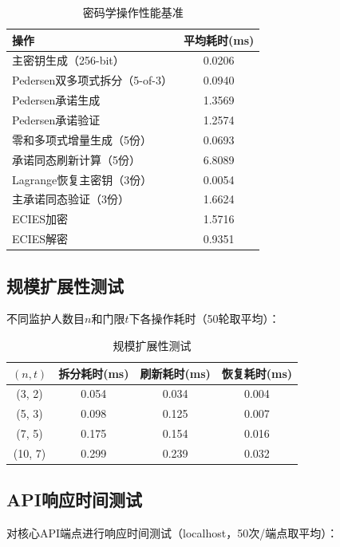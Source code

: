 \documentclass[UTF8,a4paper,zihao=-4,openany]{ctexrep}
\begin{document}
\begin{table}[htbp]
\centering
\caption{密码学操作性能基准}
\label{tab:perf_bench}
\begin{tabularx}{\textwidth}{lc}
\toprule
操作 & 平均耗时(ms)\\
\midrule
主密钥生成（256-bit） & 0.0206\\
Pedersen双多项式拆分（5-of-3） & 0.0940\\
Pedersen承诺生成 & 1.3569\\
Pedersen承诺验证 & 1.2574\\
零和多项式增量生成（5份） & 0.0693\\
承诺同态刷新计算（5份） & 6.8089\\
Lagrange恢复主密钥（3份） & 0.0054\\
主承诺同态验证（3份） & 1.6624\\
ECIES加密 & 1.5716\\
ECIES解密 & 0.9351\\
\bottomrule
\end{tabularx}
\end{table}

\subsection{规模扩展性测试}

不同监护人数目$n$和门限$t$下各操作耗时（50轮取平均）：

\begin{table}[htbp]
\centering
\caption{规模扩展性测试}
\label{tab:scalability}
\begin{tabularx}{\textwidth}{cccc}
\toprule
$(n, t)$ & 拆分耗时(ms) & 刷新耗时(ms) & 恢复耗时(ms)\\
\midrule
(3, 2) & 0.054 & 0.034 & 0.004\\
(5, 3) & 0.098 & 0.125 & 0.007\\
(7, 5) & 0.175 & 0.154 & 0.016\\
(10, 7) & 0.299 & 0.239 & 0.032\\
\bottomrule
\end{tabularx}
\end{table}

\subsection{API响应时间测试}

对核心API端点进行响应时间测试（localhost，50次/端点取平均）：
\end{document}
